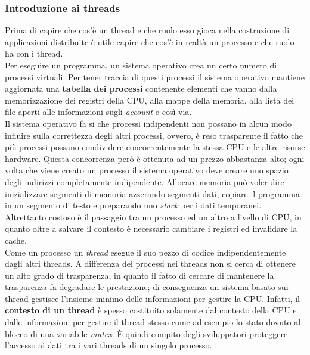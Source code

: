 \subsubsection{Introduzione ai threads}
Prima di capire che cos'è un thread e che ruolo esso gioca nella costruzione di applicazioni distribuite è utile capire che cos'è in realtà un processo e che ruolo ha con i thread.\\
Per eseguire un programma, un sistema operativo crea un certo numero di processi virtuali. Per tener traccia di questi processi il sistema operativo mantiene aggiornata una \textbf{tabella dei processi} contenente elementi che vanno dalla memorizzazione dei registri della CPU, alla mappe della memoria, alla lista dei file aperti alle informazioni sugli \emph{account} e così via.\\
Il sistema operativo fa si che processi indipendenti non possano in alcun modo influire sulla correttezza degli altri processi, ovvero, è reso trasparente il fatto che più processi possano condividere concorrentemente la stessa CPU e le altre risorse hardware. Questa concorrenza però è ottenuta ad un prezzo abbastanza alto; ogni volta che viene creato un processo il sistema operativo deve creare uno spazio degli indirizzi completamente indipendente. Allocare memoria può voler dire inizializzare segmenti di memoria azzerando segmenti dati, copiare il programma in un segmento di testo e preparando uno \emph{stack} per i dati temporanei. Altrettanto costoso è il passaggio tra un processo ed un altro a livello di CPU, in quanto oltre a salvare il contesto è necessario cambiare i registri ed invalidare la cache.\\
Come un processo un \emph{thread} esegue il suo pezzo di codice indipendentemente dagli altri threads. A differenza dei processi nei threads non si cerca di ottenere un alto grado di trasparenza, in quanto il fatto di cercare di mantenere la trasparenza fa degradare le prestazione; di conseguenza un sistema basato sui thread gestisce l'insieme minimo delle informazioni per gestire la CPU. Infatti, il \textbf{contesto di un thread} è spesso costituito solamente dal contesto della CPU e dalle informazioni per gestire il thread stesso come ad esempio lo stato dovuto al blocco di una variabile \emph{mutex}. \uppercase{è} quindi compito degli sviluppatori proteggere l'accesso ai dati tra i vari threads di un singolo processo.
